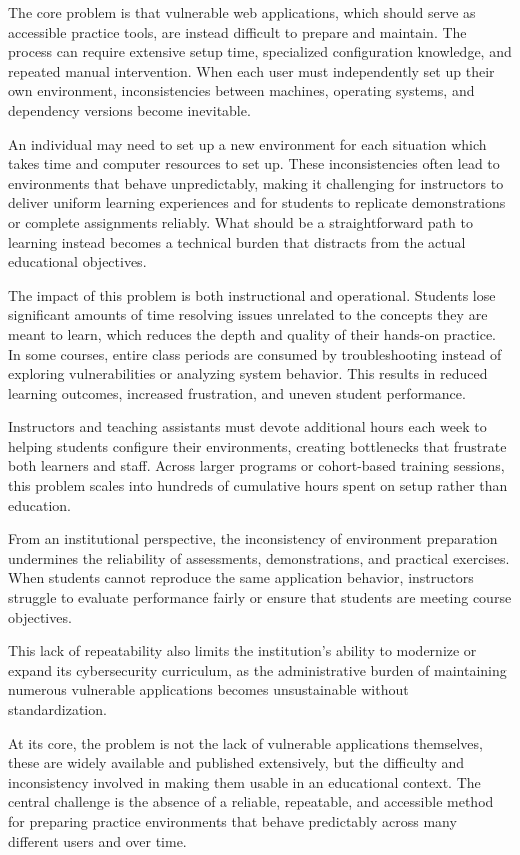 \documentclass[12pt,titlepage]{article}
\begin{document}
The core problem is that vulnerable web applications, which should serve as accessible practice tools, are instead difficult to prepare and maintain. The process can require extensive setup time, specialized configuration knowledge, and repeated manual intervention. When each user must independently set up their own environment, inconsistencies between machines, operating systems, and dependency versions become inevitable.

An individual may need to set up a new environment for each situation which takes time and computer resources to set up. These inconsistencies often lead to environments that behave unpredictably, making it challenging for instructors to deliver uniform learning experiences and for students to replicate demonstrations or complete assignments reliably. What should be a straightforward path to learning instead becomes a technical burden that distracts from the actual educational objectives.

The impact of this problem is both instructional and operational. Students lose significant amounts of time resolving issues unrelated to the concepts they are meant to learn, which reduces the depth and quality of their hands-on practice. In some courses, entire class periods are consumed by troubleshooting instead of exploring vulnerabilities or analyzing system behavior. This results in reduced learning outcomes, increased frustration, and uneven student performance.

Instructors and teaching assistants must devote additional hours each week to helping students configure their environments, creating bottlenecks that frustrate both learners and staff. Across larger programs or cohort-based training sessions, this problem scales into hundreds of cumulative hours spent on setup rather than education.

From an institutional perspective, the inconsistency of environment preparation undermines the reliability of assessments, demonstrations, and practical exercises. When students cannot reproduce the same application behavior, instructors struggle to evaluate performance fairly or ensure that students are meeting course objectives.

This lack of repeatability also limits the institution’s ability to modernize or expand its cybersecurity curriculum, as the administrative burden of maintaining numerous vulnerable applications becomes unsustainable without standardization.

At its core, the problem is not the lack of vulnerable applications themselves, these are widely available and published extensively, but the difficulty and inconsistency involved in making them usable in an educational context. The central challenge is the absence of a reliable, repeatable, and accessible method for preparing practice environments that behave predictably across many different users and over time.
\end{document}

